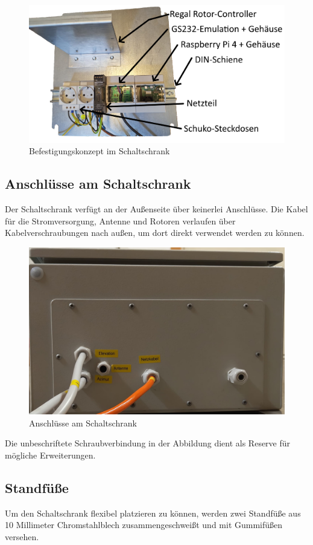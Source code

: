 \begin{figure}[H]
	\centering
	\includegraphics[width=0.7\linewidth]{../ref/Schaltschrank_Befestigung.jpg}
	\caption{Befestigungskonzept im Schaltschrank}
	\label{fig:schaltschrankbefestigung}
\end{figure}

\subsection{Anschlüsse am Schaltschrank}
Der Schaltschrank verfügt an der Außenseite über keinerlei Anschlüsse. Die Kabel für die Stromversorgung, Antenne und Rotoren verlaufen über Kabelverschraubungen nach außen, um dort direkt verwendet werden zu können. 

\begin{figure}[H]
	\centering
	\includegraphics[width=0.7\linewidth]{../ref/Schaltschrank_Anschluss.jpeg}
	\caption{Anschlüsse am Schaltschrank}
	\label{fig:schaltschrankanschluesse}
\end{figure}

Die unbeschriftete Schraubverbindung in der Abbildung dient als Reserve für mögliche Erweiterungen.

\subsection{Standfüße}
Um den Schaltschrank flexibel platzieren zu können, werden zwei Standfüße aus 10 Millimeter Chromstahlblech zusammengeschweißt und mit Gummifüßen versehen. 

